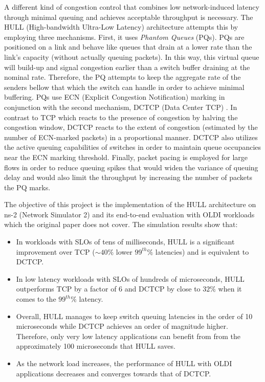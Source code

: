 \documentclass[10pt,conference,compsocconf]{IEEEtran}
\begin{document}
A different kind of congestion control that combines low network-induced latency through minimal queuing and achieves acceptable throughput is necessary. The HULL (High-bandwidth Ultra-Low Latency) architecture \cite{HULL} attempts this by employing three mechanisms. First, it uses \textit{Phantom Queues} (PQs). PQs are positioned on a link and behave like queues that drain at a lower rate than the link's capacity (without actually queuing packets). In this way, this virtual queue will build-up and signal congestion earlier than a switch buffer draining at the nominal rate. Therefore, the PQ attempts to keep the aggregate rate of the senders bellow that which the switch can handle in order to achieve minimal buffering. PQs use ECN (Explicit Congestion Notification) marking in conjunction with the second mechanism, DCTCP (Data Center TCP) \cite{DCTCP}. In contrast to TCP which reacts to the presence of congestion by halving the congestion window, DCTCP reacts to the extent of congestion (estimated by the number of ECN-marked packets) in a proportional manner. DCTCP also utilizes the active queuing capabilities of switches in order to maintain queue occupancies near the ECN marking threshold. Finally, packet pacing is employed for large flows in order to reduce queuing spikes that would widen the variance of queuing delay and would also limit the throughput by increasing the number of packets the PQ marks.

The objective of this project is the implementation of the HULL architecture on ns-2 (Network Simulator 2) \cite{NS2} and its end-to-end evaluation with OLDI workloads which the original paper \cite{HULL} does not cover. The simulation results show that:
\begin{itemize}
    \item In workloads with SLOs of tens of milliseconds, HULL is a significant improvement over TCP ($\sim40\%$ lower $99^{th}\%$ latencies) and is equivalent to DCTCP. 
    \item In low latency workloads with SLOs of hundreds of microseconds, HULL outperforms TCP by a factor of $6$ and DCTCP by close to $32\%$ when it comes to the $99^{th}\%$ latency.
    \item Overall, HULL manages to keep switch queuing latencies in the order of 10 microseconds while DCTCP achieves an order of magnitude higher. Therefore, only very low latency applications can benefit from from the approximately 100 microseconds that HULL saves.
    \item As the network load increases, the performance of HULL with OLDI applications decreases and converges towards that of DCTCP.
\end{itemize}
\end{document}

